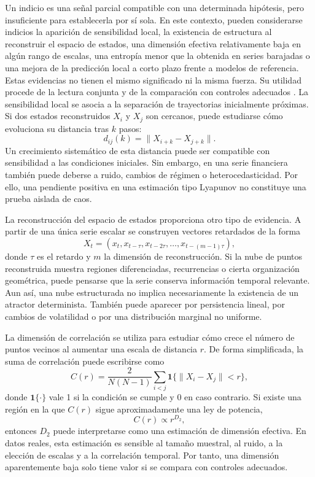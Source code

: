 Un indicio es una señal parcial compatible con una determinada hipótesis, pero insuficiente para establecerla por sí sola. En este contexto, pueden considerarse indicios la aparición de sensibilidad local, la existencia de estructura al reconstruir el espacio de estados, una dimensión efectiva relativamente baja en algún rango de escalas, una entropía menor que la obtenida en series barajadas o una mejora de la predicción local a corto plazo frente a modelos de referencia. Estas evidencias no tienen el mismo significado ni la misma fuerza. Su utilidad procede de la lectura conjunta y de la comparación con controles adecuados \cite{abarbanel1996,kantz2003,theiler1992}.
La sensibilidad local se asocia a la separación de trayectorias inicialmente próximas. Si dos estados reconstruidos \(X_i\) y \(X_j\) son cercanos, puede estudiarse cómo evoluciona su distancia tras \(k\) pasos:
\begin{equation}
    d_{ij}(k) = \|X_{i+k} - X_{j+k}\|.
\end{equation}
Un crecimiento sistemático de esta distancia puede ser compatible con sensibilidad a las condiciones iniciales. Sin embargo, en una serie financiera también puede deberse a ruido, cambios de régimen o heterocedasticidad. Por ello, una pendiente positiva en una estimación tipo Lyapunov no constituye una prueba aislada de caos.

La reconstrucción del espacio de estados proporciona otro tipo de evidencia. A partir de una única serie escalar se construyen vectores retardados de la forma
\begin{equation}
    X_t = (x_t, x_{t-\tau}, x_{t-2\tau}, \ldots, x_{t-(m-1)\tau}),
\end{equation}
donde \(\tau\) es el retardo y \(m\) la dimensión de reconstrucción. Si la nube de puntos reconstruida muestra regiones diferenciadas, recurrencias o cierta organización geométrica, puede pensarse que la serie conserva información temporal relevante. Aun así, una nube estructurada no implica necesariamente la existencia de un atractor determinista. También puede aparecer por persistencia lineal, por cambios de volatilidad o por una distribución marginal no uniforme.

La dimensión de correlación se utiliza para estudiar cómo crece el número de puntos vecinos al aumentar una escala de distancia \(r\). De forma simplificada, la suma de correlación puede escribirse como
\begin{equation}
    C(r)=\frac{2}{N(N-1)}\sum_{i<j}\mathbf{1}\{\|X_i-X_j\|<r\},
\end{equation}
donde \(\mathbf{1}\{\cdot\}\) vale 1 si la condición se cumple y 0 en caso contrario. Si existe una región en la que \(C(r)\) sigue aproximadamente una ley de potencia,
\begin{equation}
    C(r) \propto r^{D_2},
\end{equation}
entonces \(D_2\) puede interpretarse como una estimación de dimensión efectiva. En datos reales, esta estimación es sensible al tamaño muestral, al ruido, a la elección de escalas y a la correlación temporal. Por tanto, una dimensión aparentemente baja solo tiene valor si se compara con controles adecuados.

